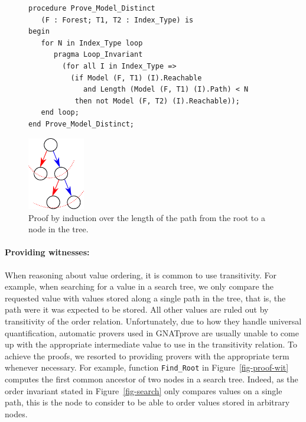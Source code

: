 \documentclass{llncs}
\newcommand{\gnatprove}{GNATprove\xspace}
\begin{document}
\begin{figure}
\begin{minipage}[c]{.75\linewidth}
\begin{small}
\begin{lstlisting}
procedure Prove_Model_Distinct
   (F : Forest; T1, T2 : Index_Type) is
begin
   for N in Index_Type loop
      pragma Loop_Invariant
        (for all I in Index_Type =>
          (if Model (F, T1) (I).Reachable
             and Length (Model (F, T1) (I).Path) < N
           then not Model (F, T2) (I).Reachable));
   end loop;
end Prove_Model_Distinct;
\end{lstlisting}
\end{small}
\end{minipage}\hfill
\begin{minipage}[c]{.22\linewidth}
\begin{center}
\includegraphics[width=25mm]{induction.pdf}
\end{center}
\end{minipage}
\caption{\label{fig-proof-ind} Proof by induction over the length of the path from the root to a node in the tree.}
\end{figure}

\paragraph{Providing witnesses:}
When reasoning about value ordering, it is common to use transitivity. For example, when searching for
a value in a search tree, we only compare the requested value with values stored along a single path in
the tree, that is, the path were it was expected to be stored. All other values are ruled out by
transitivity of the order relation. Unfortunately, due to how they handle universal quantification,
automatic provers used in \gnatprove are usually unable to come up with the appropriate
intermediate value to use in the transitivity relation. To achieve the proofs, we resorted to providing
provers with the appropriate term whenever necessary. For example, function \texttt{Find\_Root} in
Figure~\ref{fig-proof-wit} computes the first common ancestor of two nodes in a search tree. Indeed, as
the order invariant stated in Figure~\ref{fig-search} only compares values on a single path, this
is the node to consider to be able to order values stored in arbitrary nodes.
\end{document}

